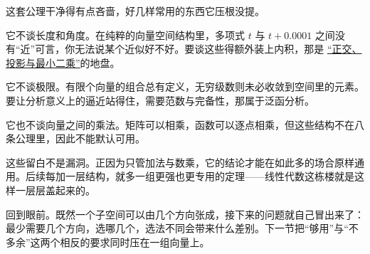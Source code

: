 这套公理干净得有点吝啬，好几样常用的东西它压根没提。

它不谈长度和角度。在纯粹的向量空间结构里，多项式 \(t\) 与 \(t+0.0001\) 之间没有``近''可言，你无法说某个近似好不好。要谈这些得额外装上内积，那是 \hyperref[ch:018]{``正交、投影与最小二乘''}的地盘。

它不谈极限。有限个向量的组合总有定义，无穷级数则未必收敛到空间里的元素。要让分析意义上的逼近站得住，需要范数与完备性，那属于泛函分析。

它也不谈向量之间的乘法。矩阵可以相乘，函数可以逐点相乘，但这些结构不在八条公理里，因此不能默认可用。

这些留白不是漏洞。正因为只管加法与数乘，它的结论才能在如此多的场合原样通用。后续每加一层结构，就多一组更强也更专用的定理——线性代数这栋楼就是这样一层层盖起来的。

回到眼前。既然一个子空间可以由几个方向张成，接下来的问题就自己冒出来了：最少需要几个方向，选哪几个，选法不同会带来什么差别。下一节把``够用''与``不多余''这两个相反的要求同时压在一组向量上。
